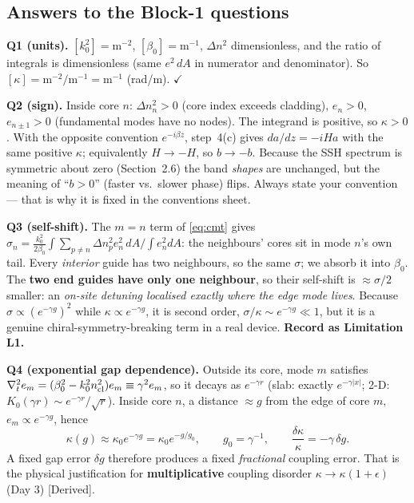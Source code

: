 \documentclass[10pt,a4paper]{article}
\newcommand{\evd}[1]{\textsf{\small[#1]}}
\begin{document}
\subsection{Answers to the Block-1 questions}
\textbf{Q1 (units).} $[k_0^2]=\mathrm{m^{-2}}$, $[\beta_0]=\mathrm{m^{-1}}$, $\Delta n^2$ dimensionless, and the ratio of integrals is dimensionless (same $e^2\,dA$ in numerator and denominator). So $[\kappa]=\mathrm{m^{-2}}/\mathrm{m^{-1}}=\mathrm{m^{-1}}$ (rad/m). $\checkmark$

\textbf{Q2 (sign).} Inside core $n$: $\Delta n_n^2>0$ (core index exceeds cladding), $e_n>0$, $e_{n\pm1}>0$ (fundamental modes have no nodes). The integrand is positive, so $\kappa>0$. With the opposite convention $e^{-i\beta z}$, step~4(c) gives $da/dz=-iHa$ with the same positive $\kappa$; equivalently $H\to-H$, so $b\to-b$. Because the SSH spectrum is symmetric about zero (Section~2.6) the band \emph{shapes} are unchanged, but the meaning of ``$b>0$'' (faster vs.\ slower phase) flips. Always state your convention --- that is why it is fixed in the conventions sheet.

\textbf{Q3 (self-shift).} The $m=n$ term of \eqref{eq:cmt} gives $\sigma_n=\frac{k_0^2}{2\beta_0}\int\sum_{p\neq n}\Delta n_p^2e_n^2\,dA/\int e_n^2dA$: the neighbours' cores sit in mode $n$'s own tail. Every \emph{interior} guide has two neighbours, so the same $\sigma$; we absorb it into $\beta_0$. The \textbf{two end guides have only one neighbour}, so their self-shift is $\approx\sigma/2$ smaller: an \emph{on-site detuning localised exactly where the edge mode lives}. Because $\sigma\propto(e^{-\gamma g})^2$ while $\kappa\propto e^{-\gamma g}$, it is second order, $\sigma/\kappa\sim e^{-\gamma g}\ll1$, but it is a genuine chiral-symmetry-breaking term in a real device. \textbf{Record as Limitation L1.}

\textbf{Q4 (exponential gap dependence).} Outside its core, mode $m$ satisfies $\nabla_t^2e_m=(\beta_0^2-k_0^2n_{\rm cl}^2)e_m\equiv\gamma^2e_m$, so it decays as $e^{-\gamma r}$ (slab: exactly $e^{-\gamma|x|}$; 2-D: $K_0(\gamma r)\sim e^{-\gamma r}/\sqrt r$). Inside core $n$, a distance $\approx g$ from the edge of core $m$, $e_m\propto e^{-\gamma g}$, hence
\[
\kappa(g)\approx\kappa_0e^{-\gamma g}=\kappa_0e^{-g/g_0},\qquad g_0=\gamma^{-1},\qquad \frac{\delta\kappa}{\kappa}=-\gamma\,\delta g .
\]
A fixed gap error $\delta g$ therefore produces a fixed \emph{fractional} coupling error. That is the physical justification for \textbf{multiplicative} coupling disorder $\kappa\to\kappa(1+\epsilon)$ (Day 3) \evd{Derived}.
\end{document}

